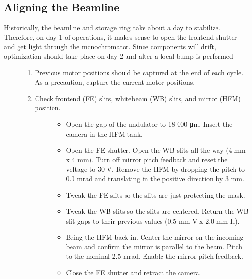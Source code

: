 \documentclass[letterpaper,10pt,english]{sphinxmanual}
\begin{document}
\subsection{Aligning the Beamline}
\label{\detokenize{staff:aligning-the-beamline}}\begin{description}
\item[{Historically, the beamline and storage ring take about a day to stabilize. Therefore, on day 1 of operations, it makes sense to open the front\sphinxhyphen{}end shutter and get light through the monochromator. Since components will drift, optimization should take place on day 2 and after a local bump is performed.}] \leavevmode\begin{enumerate}
%
\item {} 
\sphinxAtStartPar
Previous motor positions should be captured at the end of each cycle. As a precaution, capture the current motor positions.

\item {} \begin{description}
\item[{Check front\sphinxhyphen{}end (FE) slits, white\sphinxhyphen{}beam (WB) slits, and mirror (HFM) position.}] \leavevmode\begin{itemize}
\item {} 
\sphinxAtStartPar
Open the gap of the undulator to 18 000 μm. Insert the camera in the HFM tank.

\item {} 
\sphinxAtStartPar
Open the FE shutter. Open the WB slits all the way (4 mm x 4 mm). Turn off mirror pitch feedback and reset the voltage to 30 V. Remove the HFM by dropping the pitch to 0.0 mrad and translating in the positive direction by 3 mm.

\item {} 
\sphinxAtStartPar
Tweak the FE slits so the slits are just protecting the mask.

\item {} 
\sphinxAtStartPar
Tweak the WB slits so the slits are centered. Return the WB slit gaps to their previous values (0.5 mm V x 2.0 mm H).

\item {} 
\sphinxAtStartPar
Bring the HFM back in. Center the mirror on the incoming beam and confirm the mirror is parallel to the beam. Pitch to the nominal 2.5 mrad. Enable the mirror pitch feedback.

\item {} 
\sphinxAtStartPar
Close the FE shutter and retract the camera.


\end{itemize}
\end{description}
\end{enumerate}
\end{description}
\end{document}
